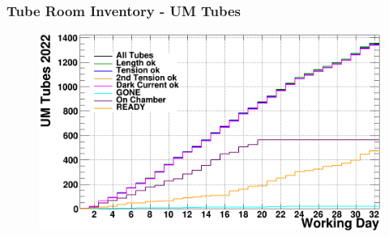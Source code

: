 \documentclass{beamer}
\begin{document}
\begin{frame}
	\frametitle{Tube Room Inventory - UM Tubes}
	\begin{figure}
		\includegraphics[width=\linewidth]{UMdaily2022.png}
	\end{figure}
\end{frame}
\end{document}

